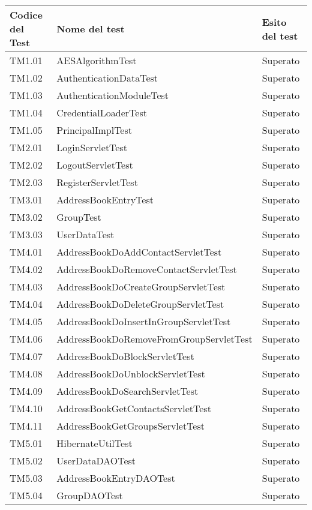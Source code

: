 \begin{center}
\begin{longtable}{p{}ll}
\toprule Codice del Test & Nome del test  & Esito del test\\
\midrule

TM1.01 & AESAlgorithmTest &Superato\\
TM1.02 & AuthenticationDataTest &Superato\\
TM1.03 & AuthenticationModuleTest &Superato\\
TM1.04 & CredentialLoaderTest &Superato\\
TM1.05 & PrincipalImplTest &Superato\\
TM2.01 & LoginServletTest &Superato\\
TM2.02 & LogoutServletTest &Superato\\
TM2.03 & RegisterServletTest &Superato\\
TM3.01 & AddressBookEntryTest &Superato\\
TM3.02 & GroupTest &Superato\\
TM3.03 & UserDataTest &Superato\\
TM4.01 & AddressBookDoAddContactServletTest &Superato\\
TM4.02 & AddressBookDoRemoveContactServletTest &Superato\\
TM4.03 & AddressBookDoCreateGroupServletTest &Superato\\
TM4.04 & AddressBookDoDeleteGroupServletTest &Superato\\
TM4.05 & AddressBookDoInsertInGroupServletTest &Superato\\
TM4.06 & AddressBookDoRemoveFromGroupServletTest &Superato\\
TM4.07 & AddressBookDoBlockServletTest &Superato\\
TM4.08 & AddressBookDoUnblockServletTest &Superato\\
TM4.09 & AddressBookDoSearchServletTest &Superato\\
TM4.10 & AddressBookGetContactsServletTest &Superato\\
TM4.11 & AddressBookGetGroupsServletTest &Superato\\
TM5.01 & HibernateUtilTest &Superato\\
TM5.02 & UserDataDAOTest &Superato\\
TM5.03 & AddressBookEntryDAOTest &Superato\\
TM5.04 & GroupDAOTest &Superato\\

\bottomrule
\end{longtable}
\end{center}

